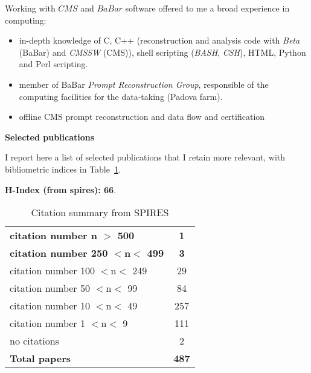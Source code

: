 \documentclass[11pt,twoside,a4paper]{article}
\begin{document}
Working with $CMS$ and $BaBar$ software offered to me a broad
experience in computing:
\begin{itemize}
\item in-depth knowledge of C, C++ (reconstruction and analysis code with {\it Beta} (BaBar) and 
  {\it CMSSW} (CMS)), shell
  scripting ({\it BASH}, {\it CSH}), HTML, Python and Perl scripting.  
\item member of BaBar {\it Prompt Reconstruction Group}, responsible
  of the computing facilities for the data-taking (Padova farm).
\item offline CMS prompt reconstruction and data flow and certification
\end{itemize}

 
\newpage

\begin{center}
  {\bf Selected publications}
\end{center}

I report here a list of selected publications that I retain more
relevant, with bibliometric indices in Table~\ref{tab:biblio}.

{\bf H-Index (from spires): 66}.



\begin{table}[h!]
  \begin{center}     
    \caption{ Citation summary from SPIRES \label{tab:biblio}}
\begin{tabular}{|l|c|} \hline
{\bf citation number n $>$ 500} &  {\bf 1} \\
{\bf citation number 250 $<$n$<$ 499} & {\bf 3} \\ 
citation number 100 $<$n$<$ 249 &  29 \\
citation number  50 $<$n$<$  99 &  84\\
citation number  10 $<$n$<$  49 &  257\\
citation number   1 $<$n$<$   9 &  111\\
no citations &  2 \\
\hline
{\bf Total papers} & {\bf 487} \\
\hline
\end{tabular}

  \end{center}
\end{table}
\end{document}
